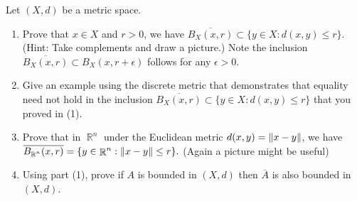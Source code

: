 \documentclass[12pt,letterpaper,boxed]{hmcpset}
\DeclareMathOperator{\R}{\mathbb{R}}
\DeclarePairedDelimiter{\norm}{\lVert}{\rVert}
\begin{document}
\begin{problem}[Exercise 1.28]
Let $(X, d)$ be a metric space.
	\vspace{-2mm}
	\begin{enumerate}
		\itemsep0em
		\item Prove that $x\in X$ and $r > 0$, we have $\overline{B_X(x,r)}\subset \{y \in X : d(x,y) \leq r\}.$ (Hint: Take complements and draw a picture.) Note the inclusion $\overline{B_X(x,r)}\subset B_X(x, r + \epsilon)$ follows for any $\epsilon > 0.$
		\item Give an example using the discrete metric that demonstrates that equality need not hold in the inclusion $\overline{B_X(x,r)}\subset \{y \in X : d(x,y) \leq r\}$ that you proved in (1).
		\item Prove that in $\R^{n}$ under the Euclidean metric $d(x, y) = \norm{x - y}$, we have $\overline{B_{\R^{n}}(x,r)} = \{y \in \R^{n} : \norm{x - y} \leq r\}.$ (Again a picture might be useful)
		\item Using part (1), prove if $A$ is bounded in $(X, d)$ then $\overline{A}$ is also bounded in $(X,d)$.
	\end{enumerate}
\end{problem}
\end{document}
